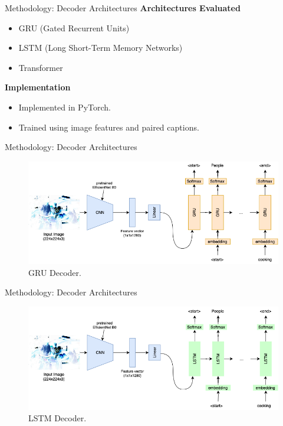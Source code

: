 \documentclass[10pt]{beamer}
\theoremstyle{remark}
\begin{document}
\begin{frame}{Methodology: Decoder Architectures}
	\textbf{Architectures Evaluated}
	\begin{itemize}
			\item GRU (Gated Recurrent Units)
			\item LSTM (Long Short-Term Memory Networks)
			\item Transformer
	\end{itemize}
	\textbf{Implementation}
	\begin{itemize}
			\item Implemented in PyTorch.
			\item Trained using image features and paired captions.
	\end{itemize}
\end{frame}

\begin{frame}{Methodology: Decoder Architectures}
	\begin{figure}[H]
		\includegraphics[width=.9\textwidth]{res/gru.png}
		\caption{GRU Decoder.}\label{fig:gru}
	\end{figure}
\end{frame}

\begin{frame}{Methodology: Decoder Architectures}
	\begin{figure}[H]
		\includegraphics[width=.9\textwidth]{res/lstm.png}
		\caption{LSTM Decoder.}\label{fig:lstm}
	\end{figure}
\end{frame}
\end{document}
